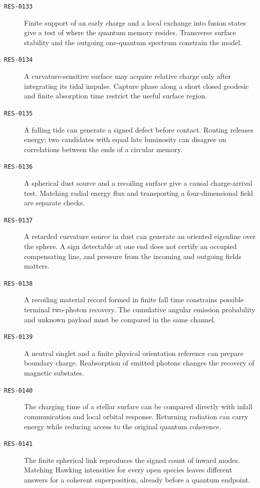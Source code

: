 \begin{description}
\item[\textnormal{\texttt{RES-0133}}] Finite support of an early charge and a local exchange into fusion states give a test of where the quantum memory resides. Transverse surface stability and the outgoing one-quantum spectrum constrain the model.
\item[\textnormal{\texttt{RES-0134}}] A curvature-sensitive surface may acquire relative charge only after integrating its tidal impulse. Capture phase along a short closed geodesic and finite absorption time restrict the useful surface region.
\item[\textnormal{\texttt{RES-0135}}] A falling tide can generate a signed defect before contact. Routing releases energy; two candidates with equal late luminosity can disagree on correlations between the ends of a circular memory.
\item[\textnormal{\texttt{RES-0136}}] A spherical dust source and a recoiling surface give a causal charge-arrival test. Matching radial energy flux and transporting a four-dimensional field are separate checks.
\item[\textnormal{\texttt{RES-0137}}] A retarded curvature source in dust can generate an oriented eigenline over the sphere. A sign detectable at one end does not certify an occupied compensating line, and pressure from the incoming and outgoing fields matters.
\item[\textnormal{\texttt{RES-0138}}] A recoiling material record formed in finite fall time constrains possible terminal two-photon recovery. The cumulative angular emission probability and unknown payload must be compared in the same channel.
\item[\textnormal{\texttt{RES-0139}}] A neutral singlet and a finite physical orientation reference can prepare boundary charge. Reabsorption of emitted photons changes the recovery of magnetic substates.
\item[\textnormal{\texttt{RES-0140}}] The charging time of a stellar surface can be compared directly with infall communication and local orbital response. Returning radiation can carry energy while reducing access to the original quantum coherence.
\item[\textnormal{\texttt{RES-0141}}] The finite spherical link reproduces the signed count of inward modes. Matching Hawking intensities for every open species leaves different answers for a coherent superposition, already before a quantum endpoint.
\end{description}

